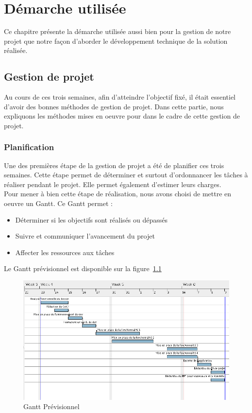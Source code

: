 \chapter{Démarche utilisée}

Ce chapitre présente la démarche utilisée aussi bien pour la gestion de notre projet que notre façon d'aborder le développement technique de la solution réalisée.

\section{Gestion de projet}

Au cours de ces trois semaines, afin d'atteindre l'objectif fixé, il était essentiel d'avoir des bonnes méthodes de gestion de projet. Dans cette partie, nous expliquons les méthodes mises en oeuvre pour dans le cadre de cette gestion de projet.

\subsection{Planification}

Une des premières étape de la gestion de projet a été de planifier ces trois semaines. Cette étape permet de déterminer et surtout d'ordonnancer les tâches à réaliser pendant le projet. Elle permet également d'estimer leurs charges.\\

Pour mener à bien cette étape de réalisation, nous avons choisi de mettre en oeuvre un Gantt. Ce Gantt permet :

\begin{itemize}
    \item Déterminer si les objectifs sont réalisés ou dépassés
    \item Suivre et communiquer l’avancement du projet
    \item Affecter les ressources aux tâches

\end{itemize}

Le Gantt prévisionnel est disponible sur la figure~\ref{fig:gantt_prev}

\begin{figure}[!ht]
\begin{center}
\includegraphics[scale = 0.3]{img/gantt-prev.png}
\end{center}
\caption{Gantt Prévisionnel}
\label{fig:gantt_prev} 
\end{figure}

